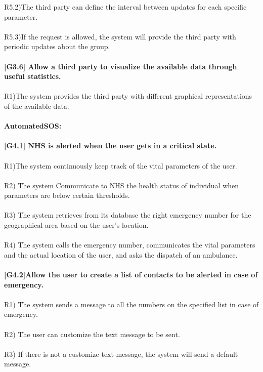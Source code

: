 R5.2)The third party can define the interval between updates for each specific parameter. \\ \\
R5.3)If the request is allowed, the system will provide the third party with periodic updates about the group. \\ \\ 
\textbf{[G3.6] Allow a third party to visualize the available data through useful statistics.} \\ \\
R1)The system provides the third party with different graphical representations of the available data. \\ \\

\textbf{AutomatedSOS:} \\ \\ 
\textbf{[G4.1] NHS is alerted when the user gets in a critical state.} \\ \\
R1)The system continuously keep track of the vital parameters of the user. \\ \\
R2) The system Communicate to NHS the health status of individual when parameters are below certain thresholds. \\ \\
R3) The system retrieves from its database the right emergency number for the geographical area based on the user’s location. \\ \\
R4) The system calls the emergency number, communicates the vital parameters and the actual location of the user, and asks the dispatch of an ambulance. \\ \\
\textbf{[G4.2]Allow the user to create a list of contacts to be alerted in case of emergency.} \\ \\
R1) The system sends a message to all the numbers on the specified list in case of emergency. \\ \\
R2) The user can customize the  text message to be sent. \\ \\
R3) If there is not a customize text message, the system will send a default message. \\ \\

